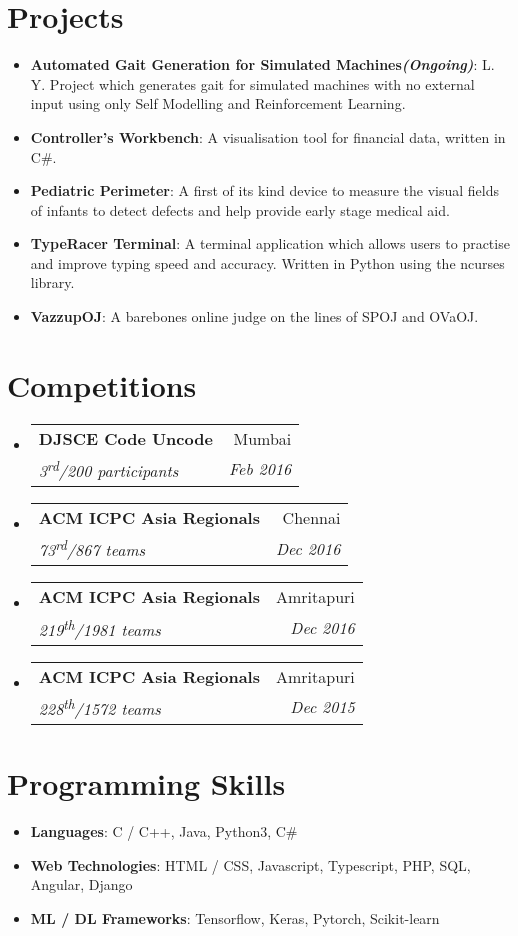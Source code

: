 \documentclass[letterpaper,11pt]{article}
\makeatletter
\newcommand{\resumeItem}[2]{
  \item\small{
    \textbf{#1}{: #2 \vspace{-2pt}}
  }
}
\newcommand{\resumeSubheading}[4]{
  \vspace{-1pt}\item
    \begin{tabular*}{0.97\textwidth}{l@{\extracolsep{\fill}}r}
      \textbf{#1} & #2 \\
      \textit{\small#3} & \textit{\small #4} \\
    \end{tabular*}\vspace{-5pt}
}
\newcommand{\resumeSubItem}[2]{\resumeItem{#1}{#2}\vspace{-4pt}}
\newcommand{\resumeSubHeadingListStart}{\begin{itemize}[leftmargin=*]}
\newcommand{\resumeSubHeadingListEnd}{\end{itemize}}
\makeatother
\begin{document}
\section{Projects}
  \resumeSubHeadingListStart
    \resumeSubItem{Automated Gait Generation for Simulated Machines{\em (Ongoing)}}
      {L. Y. Project which generates gait for simulated machines with no external input using only Self Modelling and Reinforcement Learning.}
    \resumeSubItem{Controller's Workbench}
      {A visualisation tool for financial data, written in C\#.}
    \resumeSubItem{Pediatric Perimeter}
      {A first of its kind device to measure the visual fields of infants to detect defects and help provide early stage medical aid.}
    \resumeSubItem{TypeRacer Terminal}
      {A terminal application which allows users to practise and improve typing speed and accuracy. Written in Python using the ncurses library.}
    \resumeSubItem{VazzupOJ}
      {A barebones online judge on the lines of SPOJ and OVaOJ.}
  \resumeSubHeadingListEnd

\section{Competitions}
  \resumeSubHeadingListStart
    \resumeSubheading{DJSCE Code Uncode}{Mumbai}{3\textsuperscript{rd}/200 participants}{Feb 2016}
    \resumeSubheading{ACM ICPC Asia Regionals}{Chennai}{73\textsuperscript{rd}/867 teams}{Dec 2016}
    \resumeSubheading{ACM ICPC Asia Regionals}{Amritapuri}{219\textsuperscript{th}/1981 teams}{Dec 2016}
    \resumeSubheading{ACM ICPC Asia Regionals}{Amritapuri}{228\textsuperscript{th}/1572 teams}{Dec 2015}
  \resumeSubHeadingListEnd

\section{Programming Skills}
  \resumeSubHeadingListStart
    \item{
      \textbf{Languages}{: C / C++, Java, Python3, C\#}
      \hfill
    }
    \vspace{-4pt}
    \item{
      \textbf{Web Technologies}{: HTML / CSS, Javascript, Typescript, PHP, SQL, Angular, Django}
      \hfill
    }
    \vspace{-4pt}
    \item{
      \textbf{ML / DL Frameworks}{: Tensorflow, Keras, Pytorch, Scikit-learn}
      \hfill
    }
  \resumeSubHeadingListEnd


\end{document}
